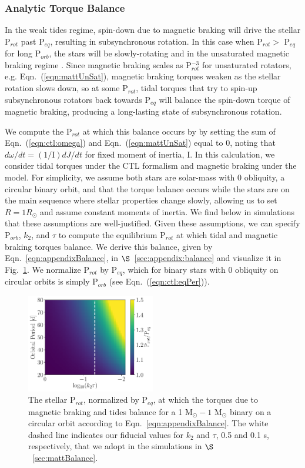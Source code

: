 \documentclass[twocolumn]{aastex61}
\begin{document}
\subsubsection{Analytic Torque Balance} \label{sec:analytic}

In the weak tides regime, spin-down due to magnetic braking will drive the stellar P$_{rot}$ past P$_{eq}$, resulting in subsynchronous rotation. In this case when P$_{rot} >$ P$_{eq}$ for long P$_{orb}$, the stars will be slowly-rotating and in the unsaturated magnetic braking regime \citep{Matt2015}. Since magnetic braking scales as P$_{rot}^{-3}$ for unsaturated rotators, e.g. Eqn.~(\ref{eqn:mattUnSat}), magnetic braking torques weaken as the stellar rotation slows down, so at some P$_{rot}$, tidal torques that try to spin-up subsynchronous rotators back towards P$_{eq}$ will balance the spin-down torque of magnetic braking, producing a long-lasting state of subsynchronous rotation. 

We compute the P$_{rot}$ at which this balance occurs by by setting the sum of Eqn.~(\ref{eqn:ctl:omega}) and Eqn.~(\ref{eqn:mattUnSat}) equal to 0, noting that $d\omega/dt = (1/\mathrm{I}) dJ/dt$ for fixed moment of inertia, I.  In this calculation, we consider tidal torques under the CTL formalism and magnetic braking under the \citet{Matt2015} model. For simplicity, we assume both stars are solar-mass with 0 obliquity, a circular binary orbit, and that the torque balance occurs while the stars are on the main sequence where stellar properties change slowly, allowing us to set $R = 1 R_{\odot}$ and assume constant moments of inertia. We find below in simulations that these assumptions are well-justified. Given these assumptions, we can specify P$_{orb}$, $k_2$, and $\tau$ to compute the equilibrium P$_{rot}$ at which tidal and magnetic braking torques balance.  We derive this balance, given by Eqn.~\ref{eqn:appendixBalance}, in $\S$~\ref{sec:appendix:balance} and visualize it in Fig.~\ref{fig:analyticBalance}. We normalize P$_{rot}$ by P$_{eq}$, which for binary stars with 0 obliquity on circular orbits is simply P$_{orb}$ (see Eqn.~(\ref{eqn:ctl:eqPer})).

\begin{figure}[h]
	\includegraphics[width=0.5\textwidth]{../Plots/analyticTorque.pdf}
   \caption{The stellar P$_{rot}$, normalized by P$_{eq}$, at which the torques due to magnetic braking and tides balance for a 1 M$_{\odot} - 1$ M$_{\odot}$ binary on a circular orbit according to Eqn.~\ref{eqn:appendixBalance}. The white dashed line indicates our fiducial values for $k_2$ and $\tau$, 0.5 and 0.1 s, respectively, that we adopt in the simulations in $\S$~\ref{sec:mattBalance}.}%
    \label{fig:analyticBalance}%
\end{figure}
\end{document}

